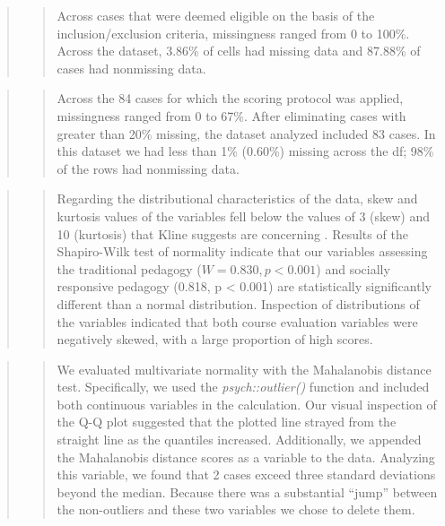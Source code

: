 \documentclass[
  11pt,
]{book}
\begin{document}
\begin{quote}
\begin{quote}
Across cases that were deemed eligible on the basis of the inclusion/exclusion criteria, missingness ranged from 0 to 100\%. Across the dataset, 3.86\% of cells had missing data and 87.88\% of cases had nonmissing data.
\end{quote}
\end{quote}

\begin{quote}
\begin{quote}
Across the 84 cases for which the scoring protocol was applied, missingness ranged from 0 to 67\%. After eliminating cases with greater than 20\% missing, the dataset analyzed included 83 cases. In this dataset we had less than 1\% (0.60\%) missing across the df; 98\% of the rows had nonmissing data.
\end{quote}
\end{quote}

\begin{quote}
\begin{quote}
Regarding the distributional characteristics of the data, skew and kurtosis values of the variables fell below the values of 3 (skew) and 10 (kurtosis) that Kline suggests are concerning \citeyearpar{kline_principles_2016}. Results of the Shapiro-Wilk test of normality indicate that our variables assessing the traditional pedagogy (\(W = 0.830, p < 0.001\)) and socially responsive pedagogy (0.818, p \textless{} 0.001) are statistically significantly different than a normal distribution. Inspection of distributions of the variables indicated that both course evaluation variables were negatively skewed, with a large proportion of high scores.
\end{quote}
\end{quote}

\begin{quote}
\begin{quote}
We evaluated multivariate normality with the Mahalanobis distance test. Specifically, we used the \emph{psych::outlier()} function and included both continuous variables in the calculation. Our visual inspection of the Q-Q plot suggested that the plotted line strayed from the straight line as the quantiles increased. Additionally, we appended the Mahalanobis distance scores as a variable to the data. Analyzing this variable, we found that 2 cases exceed three standard deviations beyond the median. Because there was a substantial ``jump'' between the non-outliers and these two variables we chose to delete them.
\end{quote}
\end{quote}
\end{document}
